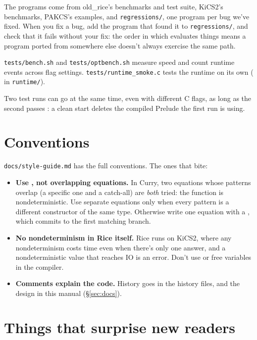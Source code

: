 \documentclass[11pt]{article}
\newcommand{\code}[1]{\texttt{\detokenize{#1}}}
\newcommand{\file}[1]{\nolinkurl{#1}}
\begin{document}
The programs come from old\_rice's benchmarks and test suite, KiCS2's
benchmarks, PAKCS's examples, and \file{regressions/}, one program per bug
we've fixed.  When you fix a bug, add the program that found it to
\file{regressions/}, and check that it fails without your fix: the order in
which \code{nf} evaluates things means a program ported from somewhere else
doesn't always exercise the same path.

\file{tests/bench.sh} and \file{tests/optbench.sh} measure speed and count
runtime events across flag settings.  \file{tests/runtime_smoke.c} tests the
runtime on its own (\code{make test} in \file{runtime/}).

Two test runs can go at the same time, even with different C flags, as long
as the second passes \code{--no-clean}: a clean start deletes the compiled
Prelude the first run is using.

\section{Conventions}

\file{docs/style-guide.md} has the full conventions.  The ones that bite:
\begin{itemize}
  \item \textbf{Use \code{case}, not overlapping equations.}  In Curry, two
    equations whose patterns overlap (a specific one and a catch-all) are
    \emph{both} tried: the function is nondeterministic.  Use separate equations
    only when every pattern is a different constructor of the same type.
    Otherwise write one equation with a \code{case}, which commits to the first
    matching branch.
  \item \textbf{No nondeterminism in Rice itself.}  Rice runs on KiCS2, where
    any nondeterminism costs time even when there's only one answer, and a
    nondeterministic value that reaches IO is an error.  Don't use \code{?} or
    free variables in the compiler.
  \item \textbf{Comments explain the code.}  History goes in the history files,
    and the design in this manual (\S\ref{sec:docs}).
\end{itemize}

\section{Things that surprise new readers}
\end{document}
